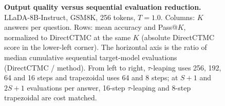\begin{figure}[t]
\endgroup
\caption{\textbf{Output quality versus sequential evaluation reduction.}
LLaDA-8B-Instruct, GSM8K, 256 tokens, \(T=1.0\).
Columns: \(K\) answers per question. Rows: mean accuracy and Pass@\(K\),
normalized to DirectCTMC at the same \(K\) (absolute DirectCTMC score in the lower-left corner).
The horizontal axis is the ratio of median cumulative sequential target-model
evaluations (DirectCTMC / method).
From left to right, \(\tau\)-leaping uses 256, 192, 64 and 16 steps and
trapezoidal uses 64 and 8 steps;
at \(S+1\) and \(2S+1\) evaluations per answer, 16-step \(\tau\)-leaping and
8-step trapezoidal are cost matched.}
\label{fig:solver-retention-by-k}
\end{figure}
